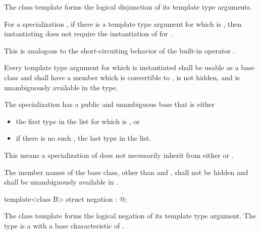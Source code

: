\begin{itemdescr}
\pnum
The class template 
forms the logical disjunction of its template type arguments.

\pnum
For a specialization ,
if there is a template type argument  for which  is ,
then instantiating 
does not require the instantiation of  for .
\begin{note} This is analogous to the short-circuiting behavior of
the built-in operator \tcode{||}.
\end{note}

\pnum
Every template type argument
for which  is instantiated
shall be usable as a base class and
shall have a member  which
is convertible to ,
is not hidden, and
is unambiguously available in the type.

\pnum
The specialization 
has a public and unambiguous base that is either
\begin{itemize}
\item the first type  in the list 
for which  is , or
\item if there is no such , the last type in the list.
\end{itemize}
\begin{note} This means a specialization of 
does not necessarily inherit from
either  or .
\end{note}

\pnum
The member names of the base class,
other than  and ,
shall not be hidden and shall be unambiguously available in .
\end{itemdescr}

%
\begin{itemdecl}
template<class B> struct negation : @\seebelow@ { };
\end{itemdecl}

\begin{itemdescr}
\pnum
The class template 
forms the logical negation of its template type argument.
The type 
is a  with a base characteristic of .
\end{itemdescr}

